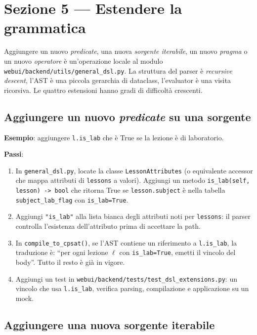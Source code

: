 \section{Sezione 5 --- Estendere la grammatica}
\label{sec:dsl-estendere}

Aggiungere un nuovo \emph{predicate}, una nuova \emph{sorgente
iterabile}, un nuovo \emph{pragma} o un nuovo \emph{operatore}
\`e un'operazione locale al modulo
\texttt{webui/backend/utils/general\_dsl.py}. La struttura del
parser \`e \emph{recursive descent}, l'AST \`e una piccola
gerarchia di dataclass, l'evaluator \`e una visita ricorsiva.
Le quattro estensioni hanno gradi di difficolt\`a crescenti.

\subsection{Aggiungere un nuovo \emph{predicate} su una sorgente}

\textbf{Esempio}: aggiungere \texttt{l.is\_lab} che \`e True se
la lezione \`e di laboratorio.

\textbf{Passi}:
\begin{enumerate}
\item In \texttt{general\_dsl.py}, locate la classe
  \texttt{LessonAttributes} (o equivalente accessor che mappa
  attributi di \texttt{lessons} a valori). Aggiungi un metodo
  \texttt{is\_lab(self, lesson) -> bool} che ritorna True se
  \texttt{lesson.subject} \`e nella tabella
  \texttt{subject\_lab\_flag} con \texttt{is\_lab=True}.
\item Aggiungi \texttt{"is\_lab"} alla lista bianca degli
  attributi noti per \texttt{lessons}: il parser controlla
  l'esistenza dell'attributo prima di accettare la path.
\item In \texttt{compile\_to\_cpsat()}, se l'AST contiene un
  riferimento a \texttt{l.is\_lab}, la traduzione \`e:
  ``per ogni lezione $\ell$ con \texttt{is\_lab=True}, emetti
  il vincolo del body''. Tutto il resto \`e gi\`a in vigore.
\item Aggiungi un test in
  \texttt{webui/backend/tests/test\_dsl\_extensions.py}: un
  vincolo che usa \texttt{l.is\_lab}, verifica parsing,
  compilazione e applicazione su un mock.
\end{enumerate}

\subsection{Aggiungere una nuova sorgente iterabile}

